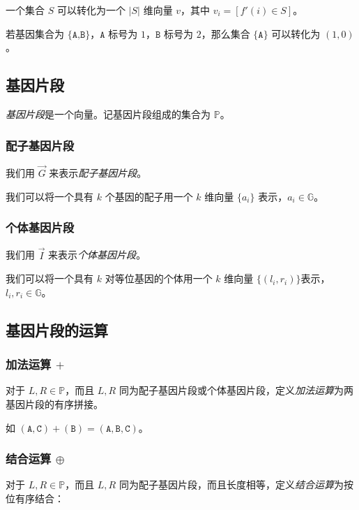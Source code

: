 \documentclass{article}
\begin{document}
一个集合 $S$ 可以转化为一个 $|S|$ 维向量 $v$，其中 $v_i=[f'(i) \in S]$。

若基因集合为 $\{\texttt{A,B}\}$，$\texttt{A}$ 标号为 $1$，$\texttt{B}$ 标号为 $2$，那么集合 $\{\texttt{A}\}$ 可以转化为 $(1,0)$。

\subsection{基因片段}

\textsl{基因片段}是一个向量。记基因片段组成的集合为 $\mathbb{P}$。

\subsubsection*{配子基因片段}

我们用 $\vec G$ 来表示\textsl{配子基因片段}。

我们可以将一个具有 $k$ 个基因的配子用一个 $k$ 维向量 $\{a_i\}$ 表示，$a_i \in \mathbb{G}$。

\subsubsection*{个体基因片段}

我们用 $\vec I$ 来表示\textsl{个体基因片段}。

我们可以将一个具有 $k$ 对等位基因的个体用一个 $k$ 维向量 $\{(l_i,r_i)\}$表示，$l_i,r_i \in \mathbb{G}$。

\subsection{基因片段的运算}

\subsubsection{加法运算 $+$}

对于 $L,R \in \mathbb{P}$，而且 $L,R$ 同为配子基因片段或个体基因片段，定义\textsl{加法运算}为两基因片段的有序拼接。

如 $(\texttt{A},\texttt{C}) + (\texttt{B}) = (\texttt{A},\texttt{B},\texttt{C})$。

\subsubsection{结合运算 $\oplus$}

对于 $L,R \in \mathbb{P}$，而且 $L,R$ 同为配子基因片段，而且长度相等，定义\textsl{结合运算}为按位有序结合：
\end{document}

